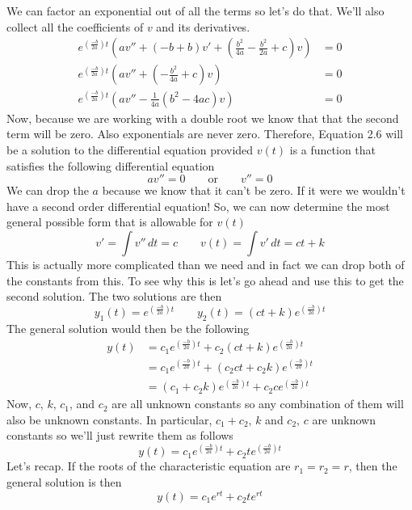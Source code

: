 \documentclass[10pt,reqno]{book}
\theoremstyle{definition}
\begin{document}
	We can factor an exponential out of all the terms so let's do that.  We'll also collect all the coefficients of $ v $ and its derivatives.
	\begin{align*}
		e^{\left(\frac{-b}{2a}\right)t} \left( av'' + (-b + b)v' + \left( \frac{b^2}{4a} - \frac{b^2}{2a} + c \right)v \right) &= 0\\
		e^{\left(\frac{-b}{2a}\right)t} \left( av'' + \left( -\frac{b^2}{4a} + c \right) v \right) &= 0\\
		e^{\left(\frac{-b}{2a}\right)t} \left( av'' - \frac{1}{4a}(b^2 - 4ac) v \right) &= 0
	\end{align*}
	Now, because we are working with a double root we know that that the second term will be zero.  Also exponentials are never zero.  Therefore, Equation 2.6 will be a solution to the differential equation provided $ v(t) $ is a function that satisfies the following differential equation
	\[ av'' = 0 \qquad \text{or} \qquad v'' = 0 \]
	We can drop the $ a $ because we know that it can't be zero. If it were we wouldn't have a second order differential equation!  So, we can now determine the most general possible form that is allowable for $ v(t) $
	\[ v' = \int v''\,dt = c \qquad v(t) = \int v'\,dt = ct + k \]
	This is actually more complicated than we need and in fact we can drop both of the constants from this. To see why this is let's go ahead and use this to get the second solution. The two solutions are then
	\[ y_1(t) = e^{\left(\frac{-b}{2a}\right)t} \qquad y_2(t) = (ct + k) e^{\left(\frac{-b}{2a}\right)t} \]
	The general solution would then be the following
	\begin{align*}
		y(t) &= c_1 e^{\left(\frac{-b}{2a}\right)t} + c_2 (ct + k) e^{\left(\frac{-b}{2a}\right)t}\\
		&= c_1 e^{\left(\frac{-b}{2a}\right)t} + (c_2 ct + c_2 k) e^{\left(\frac{-b}{2a}\right)t}\\
		&= (c_1 + c_2 k)e^{\left(\frac{-b}{2a}\right)t} + c_2 c e^{\left(\frac{-b}{2a}\right)t}
	\end{align*}
	Now, $ c,\, k,\, c_1 $, and $ c_2 $ are all unknown constants so any combination of them will also be unknown constants.  In particular, $c_1+c_2, \, k$ and  $c_2, \, c$ are unknown constants so we'll just rewrite them as follows
	\[ y(t) = c_1 e^{\left(\frac{-b}{2a}\right)t} + c_2 t e^{\left(\frac{-b}{2a}\right)t} \]
	Let's recap.  If the roots of the characteristic equation are $ r_1 = r_2 = r $, then the general solution is then
	\[ y(t) = c_1 e^{rt} + c_2 t e^{rt} \]
\end{document}
